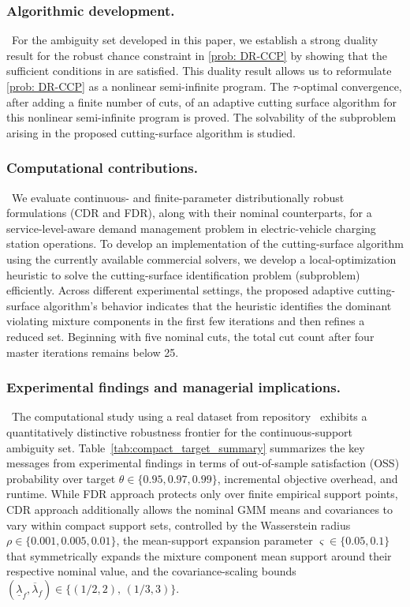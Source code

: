 \documentclass[opre,sglanonrev]{informs4}
\begin{document}
 
\subsubsection{Algorithmic development. }\, For the ambiguity set developed in this paper, we establish a strong duality result for the robust chance constraint in \eqref{prob: DR-CCP} by showing that the sufficient conditions in \cite[Theorem 1(a)]{blanchet2019quantifying} are satisfied. This duality result allows us to reformulate \eqref{prob: DR-CCP} as a nonlinear semi-infinite program. The $\tau$-optimal convergence, after adding a finite number of cuts, of an adaptive cutting surface algorithm for this nonlinear semi-infinite program is proved. The solvability of the subproblem arising in the proposed cutting-surface algorithm is studied.  


\subsubsection{Computational contributions. }\, We evaluate continuous- and finite-parameter distributionally robust formulations (CDR and FDR), along with their nominal counterparts, for a service-level-aware demand management problem in electric-vehicle charging station operations. To develop an implementation of the cutting-surface algorithm using the currently available commercial solvers, we develop a local-optimization heuristic to solve the cutting-surface identification problem (subproblem) efficiently. Across different experimental settings, the proposed adaptive cutting-surface algorithm's behavior indicates that the heuristic identifies the dominant violating mixture components in the first few iterations and then refines a reduced set. Beginning with five nominal cuts, the total cut count after four master iterations remains below 25.

\subsubsection{Experimental findings and managerial implications.  }\,  The computational study using a real dataset from repository~\cite{evcharging2025figshare} exhibits a quantitatively distinctive robustness frontier for the continuous-support ambiguity set. Table~\ref{tab:compact_target_summary} summarizes the key messages from experimental findings in terms of out-of-sample satisfaction (OSS) probability over target $\theta \in \{0.95, 0.97, 0.99\}$, incremental objective overhead, and runtime. While FDR approach protects only over finite empirical support points, CDR approach additionally allows the nominal GMM means and covariances to vary within compact support sets, controlled by the Wasserstein radius \(\rho \in \{0.001, 0.005, 0.01\}\), the mean-support expansion parameter \(\varsigma \in \{0.05,0.1\}\) that symmetrically expands the mixture component mean support around their respective nominal value, and the covariance-scaling bounds \((\underline{\lambda}_f,\overline{\lambda}_f) \in \{(1/2,2),\,(1/3,3)\}\). 
\end{document}
